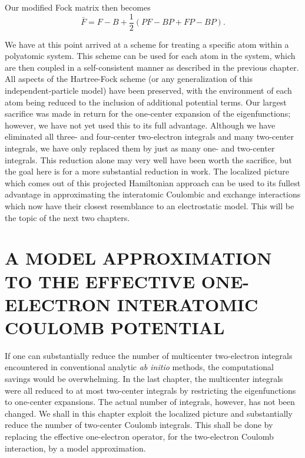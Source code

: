 \documentclass[12pt,letterpaper]{report}
\begin{document}
Our modified Fock matrix then becomes
\begin{equation}
\bar{F} = F - B + \frac{1}{2}(PF - BP + FP - BP).
\end{equation}

We have at this point arrived at a scheme for treating a specific atom within a polyatomic system. This scheme can be used for each atom in the system, which are then coupled in a self-consistent manner as described in the previous chapter. All aspects of the Hartree-Fock scheme (or any generalization of this independent-particle model) have been preserved, with the environment of each atom being reduced to the inclusion of additional potential terms. Our largest sacrifice was made in return for the one-center expansion of the eigenfunctions; however, we have not yet used this to its full advantage. Although we have eliminated all three- and four-center two-electron integrals and many two-center integrals, we have only replaced them by just as many one- and two-center integrals. This reduction alone may very well have been worth the sacrifice, but the goal here is for a more substantial reduction in work. The localized picture which comes out of this projected Hamiltonian approach can be used to its fullest advantage in approximating the interatomic Coulombic and exchange interactions which now have their closest resemblance to an electrostatic model. This will be the topic of the next two chapters.

\chapter{A MODEL APPROXIMATION TO THE EFFECTIVE ONE-ELECTRON INTERATOMIC COULOMB POTENTIAL}

If one can substantially reduce the number of multicenter two-electron integrals encountered in conventional analytic \textit{ab initio} methods, the computational savings would be overwhelming. In the last chapter, the multicenter integrals were all reduced to at most two-center integrals by restricting the eigenfunctions to one-center expansions. The actual number of integrals, however, has not been changed. We shall in this chapter exploit the localized picture and substantially reduce the number of two-center Coulomb integrals. This shall be done by replacing the effective one-electron operator, for the two-electron Coulomb interaction, by a model approximation.
\end{document}
